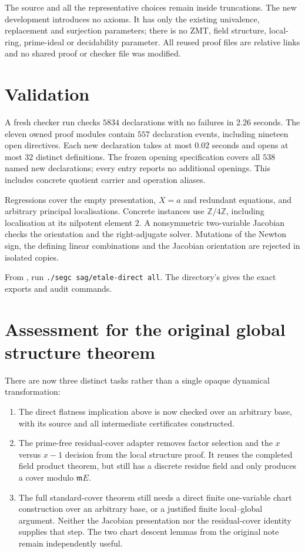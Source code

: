 \documentclass[11pt]{article}
\newcommand{\m}{\mathfrak m}
\begin{document}
The source and all the representative choices remain inside truncations.
The new development introduces no axioms. It has only the existing
univalence, replacement and surjection parameters; there is no ZMT,
field structure, local-ring, prime-ideal or decidability parameter.
All reused proof files are relative links and no shared proof or checker
file was modified.

\section{Validation}

A fresh checker run checks $5834$ declarations with no failures in
$2.26$ seconds. The eleven owned proof modules contain $557$ declaration
events, including nineteen open directives. Each new declaration takes
at most $0.02$ seconds and opens at most $32$ distinct definitions.
The frozen opening specification covers all $538$ named new declarations;
every entry reports no additional openings. This includes concrete
quotient carrier and operation aliases.

Regressions cover the empty presentation, $X=a$ and redundant equations,
and arbitrary principal localisations. Concrete instances use
$\mathbb Z/4\mathbb Z$, including localisation at its nilpotent element
$2$. A nonsymmetric two-variable Jacobian checks the orientation and the
right-adjugate solver. Mutations of the Newton sign, the defining linear
combinations and the Jacobian orientation are rejected in isolated copies.

From , run \texttt{./segc sag/etale-direct all}.
The directory's  gives the exact exports and audit commands.

\section{Assessment for the original global structure theorem}

There are now three distinct tasks rather than a single opaque
dynamical transformation:
\begin{enumerate}
\item The direct flatness implication above is now checked over an arbitrary
base, with its source and all intermediate certificates constructed.
\item The prime-free residual-cover adapter removes factor selection and
the $x$ versus $x-1$ decision from the local structure proof. It reuses
the completed field product theorem, but still has a discrete residue
field and only produces a cover modulo $\m E$.
\item The full standard-cover theorem still needs a direct finite
one-variable chart construction over an arbitrary base, or a justified
finite local--global argument. Neither the Jacobian presentation nor
the residual-cover identity supplies that step. The two chart descent
lemmas from the original note remain independently useful.
\end{enumerate}
\end{document}

